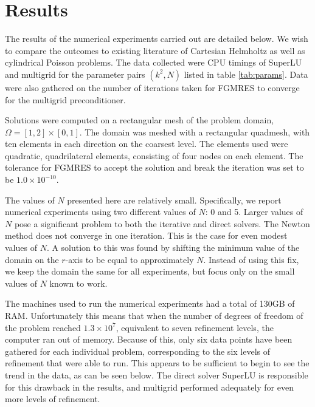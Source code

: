\chapter{Results}

\def\figwidth{0.7\columnwidth}

\def \mgcol {red}
\def \lucol {black}

\def \helmholtzfolder {data/output_k_100_n_5}
\def \poissonfolder {data/output_k_0_n_5}
\def \axisymmpoisson {data/output_k_0_n_0}
\def \axisymhelmholtz {data/output_k_10_n_0}



The results of the numerical experiments carried out are detailed below.
We wish to compare the outcomes to existing literature of Cartesian Helmholtz as well as cylindrical Poisson problems.
The data collected were CPU timings of SuperLU and multigrid for the parameter pairs $(k^2,N)$ listed in table \ref{tab:params}.
Data were also gathered on the number of iterations taken for FGMRES to converge for the multigrid preconditioner.

Solutions were computed on a rectangular mesh of the problem domain, $\Omega = [1,2] \times [0,1]$.
The domain was meshed with a rectangular quadmesh, with ten elements in each direction on the coarsest level.
The elements used were quadratic, quadrilateral elements, consisting of four nodes on each element.
The tolerance for FGMRES to accept the solution and break the iteration was set to be $1.0\times 10^{-10}$.

The values of $N$ presented here are relatively small.
Specifically, we report numerical experiments using two different values of $N$: 0 and 5.
Larger values of $N$ pose a significant problem to both the iterative and direct solvers.
The Newton method does not converge in one iteration.
This is the case for even modest values of $N$.
A solution to this was found by shifting the minimum value of the domain on the $r$-axis to be equal to approximately $N$.
Instead of using this fix, we keep the domain the same for all experiments, but focus only on the small values of $N$ known to work.

The machines used to run the numerical experiments had a total of 130GB of RAM.
Unfortunately this means that when the number of degrees of freedom of the problem reached $1.3\times 10^7$, equivalent to seven refinement levels, the computer ran out of memory.
Because of this, only six data points have been gathered for each individual problem, corresponding to the six levels of refinement that were able to run.
This appears to be sufficient to begin to see the trend in the data, as can be seen below.
The direct solver SuperLU is responsible for this drawback in the results, and multigrid performed adequately for even more levels of refinement.


